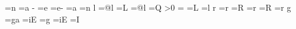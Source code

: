 {       \else
	\t@kenbuffer=\expandafter{\the\t@kenbuffer n}%
       \fi
      \or
       \t@kenbuffer=\expandafter{\the\t@kenbuffer a}%
      \fi
     \else
      \iffollowingispseudoboundary
       \if\followingchar -%
        \t@kenbuffer=\expandafter{\the\t@kenbuffer e}%
       \else
        \t@kenbuffer=\expandafter{\the\t@kenbuffer e-}%
       \fi
      \else
      \ifcase\thisfvs
       \t@kenbuffer=\expandafter{\the\t@kenbuffer a}%
      \or
       \t@kenbuffer=\expandafter{\the\t@kenbuffer n}%
      \fi
      \fi
     \fi
    \fi
   \fi
  \else \if\thischar l%
   \iffollowingisboundary%
    \ifpreviousisboundary%
     \t@kenbuffer=\expandafter{\the\t@kenbuffer @l}%
    \else%
     \t@kenbuffer=\expandafter{\the\t@kenbuffer L}%
    \fi%
   \else%
    \ifpreviousisboundary%
     \t@kenbuffer=\expandafter{\the\t@kenbuffer @l}%
    \else%
     \ifpreviousisround
      \t@kenbuffer=\expandafter{\the\t@kenbuffer Q}%
     \else
      \ifnum\raisel>0
       \t@kenbuffer=\expandafter{\the\t@kenbuffer {}}%
      \else
       \iffollowingispseudoboundary
        \t@kenbuffer=\expandafter{\the\t@kenbuffer L}%
       \else
        \t@kenbuffer=\expandafter{\the\t@kenbuffer l}%
       \fi
      \fi
     \fi
    \fi
   \fi
  \else \if\thischar r%
   \iffollowingisboundary%
    \ifpreviousisboundary%
     \t@kenbuffer=\expandafter{\the\t@kenbuffer r}%
    \else%
     \t@kenbuffer=\expandafter{\the\t@kenbuffer R}%
    \fi%
   \else%
    \ifpreviousisboundary%
     \t@kenbuffer=\expandafter{\the\t@kenbuffer r}%
    \else%
     \iffollowingispseudoboundary
      \t@kenbuffer=\expandafter{\the\t@kenbuffer R}%
     \else
      \t@kenbuffer=\expandafter{\the\t@kenbuffer r}%
     \fi
    \fi
   \fi
  \else \if\thischar g%
   \iffollowingisboundary%
    \ifpreviousisboundary%
     \t@kenbuffer=\expandafter{\the\t@kenbuffer ga}%
    \else%
     \t@kenbuffer=\expandafter{\the\t@kenbuffer iE}%
    \fi%
   \else%
    \iffollowingforcesround %
     \t@kenbuffer=\expandafter{\the\t@kenbuffer g}%
    \else
     \iffollowingispseudoboundary
      \t@kenbuffer=\expandafter{\the\t@kenbuffer iE}%
     \else
      \iffollowingisvowel
       \t@kenbuffer=\expandafter{\the\t@kenbuffer I}%
}
